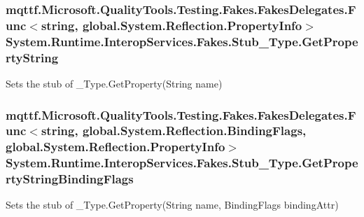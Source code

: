 \hypertarget{class_system_1_1_runtime_1_1_interop_services_1_1_fakes_1_1_stub___type_afbf085bc7997d53897b61dc020d553a7}{
\subsubsection[{Get\-Property\-String}]{\setlength{\rightskip}{0pt plus 5cm}mqttf.\-Microsoft.\-Quality\-Tools.\-Testing.\-Fakes.\-Fakes\-Delegates.\-Func$<$string, global.\-System.\-Reflection.\-Property\-Info$>$ System.\-Runtime.\-Interop\-Services.\-Fakes.\-Stub\-\_\-\-Type.\-Get\-Property\-String}}\label{class_system_1_1_runtime_1_1_interop_services_1_1_fakes_1_1_stub___type_afbf085bc7997d53897b61dc020d553a7}


Sets the stub of \-\_\-\-Type.\-Get\-Property(\-String name)

\hypertarget{class_system_1_1_runtime_1_1_interop_services_1_1_fakes_1_1_stub___type_a0e074493a4f8ec81129119b4a8fd6b0d}{
\subsubsection[{Get\-Property\-String\-Binding\-Flags}]{\setlength{\rightskip}{0pt plus 5cm}mqttf.\-Microsoft.\-Quality\-Tools.\-Testing.\-Fakes.\-Fakes\-Delegates.\-Func$<$string, global.\-System.\-Reflection.\-Binding\-Flags, global.\-System.\-Reflection.\-Property\-Info$>$ System.\-Runtime.\-Interop\-Services.\-Fakes.\-Stub\-\_\-\-Type.\-Get\-Property\-String\-Binding\-Flags}}\label{class_system_1_1_runtime_1_1_interop_services_1_1_fakes_1_1_stub___type_a0e074493a4f8ec81129119b4a8fd6b0d}


Sets the stub of \-\_\-\-Type.\-Get\-Property(\-String name, Binding\-Flags binding\-Attr)

